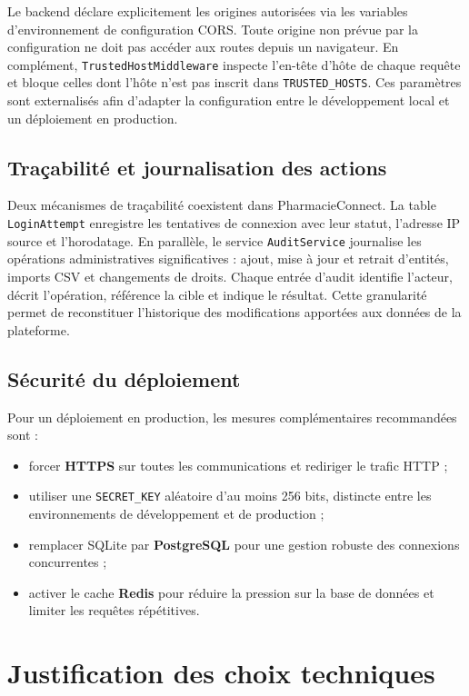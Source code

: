 Le backend déclare explicitement les origines autorisées via les variables d'environnement de configuration
CORS. Toute origine non prévue par la configuration ne doit pas accéder aux routes depuis un navigateur.
En complément, \texttt{TrustedHostMiddleware} inspecte l'en-tête d'hôte de chaque requête et bloque celles
dont l'hôte n'est pas inscrit dans \texttt{TRUSTED\_HOSTS}. Ces paramètres sont externalisés afin d'adapter
la configuration entre le développement local et un déploiement en production.

\subsection{Traçabilité et journalisation des actions}

Deux mécanismes de traçabilité coexistent dans PharmacieConnect. La table \texttt{LoginAttempt} enregistre
les tentatives de connexion avec leur statut, l'adresse IP source et l'horodatage. En parallèle, le service
\texttt{AuditService} journalise les opérations administratives significatives : ajout, mise à jour et
retrait d'entités, imports CSV et changements de droits. Chaque entrée d'audit identifie l'acteur,
décrit l'opération, référence la cible et indique le résultat. Cette granularité permet de reconstituer
l'historique des modifications apportées aux données de la plateforme.

\subsection{Sécurité du déploiement}

Pour un déploiement en production, les mesures complémentaires recommandées sont :

\begin{itemize}
    \item forcer \textbf{HTTPS} sur toutes les communications et rediriger le trafic HTTP ;
    \item utiliser une \texttt{SECRET\_KEY} aléatoire d'au moins 256 bits, distincte entre
    les environnements de développement et de production ;
    \item remplacer SQLite par \textbf{PostgreSQL} pour une gestion robuste des connexions
    concurrentes ;
    \item activer le cache \textbf{Redis} pour réduire la pression sur la base de données et
    limiter les requêtes répétitives.
\end{itemize}

\section{Justification des choix techniques}

